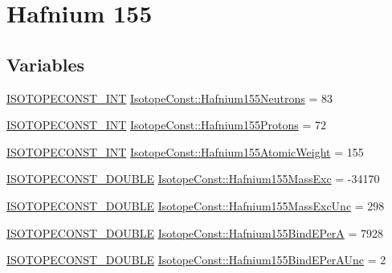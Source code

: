 \hypertarget{group___isotope_const-_hafnium-_hf155}{}\section{Hafnium 155}
\label{group___isotope_const-_hafnium-_hf155}
\subsection*{Variables}
\begin{DoxyCompactItemize}
\item 
\mbox{\hyperlink{group___isotope_const-_macros_ga5f18360b3e99483a35c32d789e62621c}{I\+S\+O\+T\+O\+P\+E\+C\+O\+N\+S\+T\+\_\+\+I\+NT}} \mbox{\hyperlink{group___isotope_const-_hafnium-_hf155_ga161be35584a2e47b450b8576791bc240}{Isotope\+Const\+::\+Hafnium155\+Neutrons}} = 83
\item 
\mbox{\hyperlink{group___isotope_const-_macros_ga5f18360b3e99483a35c32d789e62621c}{I\+S\+O\+T\+O\+P\+E\+C\+O\+N\+S\+T\+\_\+\+I\+NT}} \mbox{\hyperlink{group___isotope_const-_hafnium-_hf155_ga7494dfb61ec47332d23f396824e2658e}{Isotope\+Const\+::\+Hafnium155\+Protons}} = 72
\item 
\mbox{\hyperlink{group___isotope_const-_macros_ga5f18360b3e99483a35c32d789e62621c}{I\+S\+O\+T\+O\+P\+E\+C\+O\+N\+S\+T\+\_\+\+I\+NT}} \mbox{\hyperlink{group___isotope_const-_hafnium-_hf155_gaff78a64e7fd09362bcfcf5663ee680e1}{Isotope\+Const\+::\+Hafnium155\+Atomic\+Weight}} = 155
\item 
\mbox{\hyperlink{group___isotope_const-_macros_ga8f45a7272ce02c0b4c65c44636ed719a}{I\+S\+O\+T\+O\+P\+E\+C\+O\+N\+S\+T\+\_\+\+D\+O\+U\+B\+LE}} \mbox{\hyperlink{group___isotope_const-_hafnium-_hf155_ga83140c9862b00470e53f24b49a87edab}{Isotope\+Const\+::\+Hafnium155\+Mass\+Exc}} = -\/34170
\item 
\mbox{\hyperlink{group___isotope_const-_macros_ga8f45a7272ce02c0b4c65c44636ed719a}{I\+S\+O\+T\+O\+P\+E\+C\+O\+N\+S\+T\+\_\+\+D\+O\+U\+B\+LE}} \mbox{\hyperlink{group___isotope_const-_hafnium-_hf155_ga9edde1d47402eb0ae2d25834088bec8c}{Isotope\+Const\+::\+Hafnium155\+Mass\+Exc\+Unc}} = 298
\item 
\mbox{\hyperlink{group___isotope_const-_macros_ga8f45a7272ce02c0b4c65c44636ed719a}{I\+S\+O\+T\+O\+P\+E\+C\+O\+N\+S\+T\+\_\+\+D\+O\+U\+B\+LE}} \mbox{\hyperlink{group___isotope_const-_hafnium-_hf155_ga8508aef17065734165a456be416deb38}{Isotope\+Const\+::\+Hafnium155\+Bind\+E\+PerA}} = 7928
\item 
\mbox{\hyperlink{group___isotope_const-_macros_ga8f45a7272ce02c0b4c65c44636ed719a}{I\+S\+O\+T\+O\+P\+E\+C\+O\+N\+S\+T\+\_\+\+D\+O\+U\+B\+LE}} \mbox{\hyperlink{group___isotope_const-_hafnium-_hf155_ga404bdb40e313286f6d13f8b77545c903}{Isotope\+Const\+::\+Hafnium155\+Bind\+E\+Per\+A\+Unc}} = 2

\end{DoxyCompactItemize}
